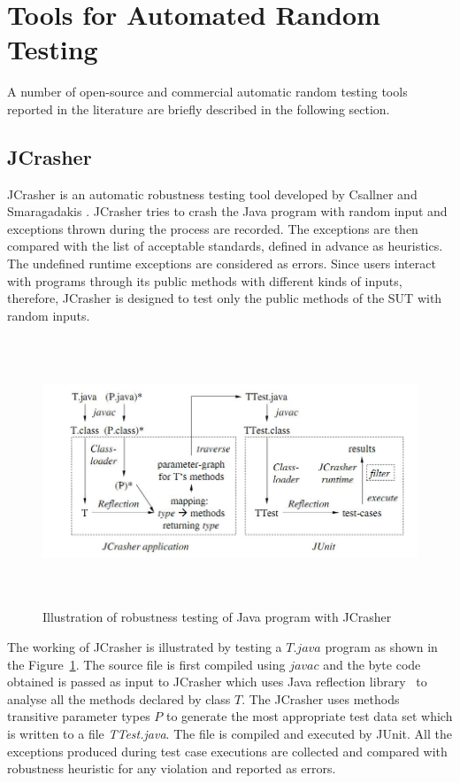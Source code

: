\section{Tools for Automated Random Testing}
A number of open-source and commercial automatic random testing tools reported in the literature are briefly described in the following section.


\subsection{JCrasher}
JCrasher is an automatic robustness testing tool developed by Csallner and Smaragadakis \cite{Pacheco2007b}. JCrasher tries to crash the Java program with random input and exceptions thrown during the process are recorded. The exceptions are then compared with the list of acceptable standards, defined in advance as heuristics. The undefined runtime exceptions are considered as errors. Since users interact with programs through its public methods with different kinds of inputs, therefore, JCrasher is designed to test only the public methods of the SUT with random inputs.

\begin{figure}[h]
	\centering
	\includegraphics[width=15cm, height=8cm]{chapter3/JCrasher.png}
	\caption{Illustration of robustness testing of Java program with JCrasher~\cite{Pacheco2007b}}
	\label{fig:JCrasher}
\end{figure}

The working of JCrasher is illustrated by testing a $T.java$ program as shown in the Figure~\ref{fig:JCrasher}. The source file is first compiled using $javac$ and the byte code obtained is passed as input to JCrasher which uses Java reflection library~\cite{chan1999java} to analyse all the methods declared by class $T$. The JCrasher uses methods transitive parameter types $P$ to generate the most appropriate test data set which is written to a file {\it TTest.java}. The file is compiled and executed by JUnit. All the exceptions produced during test case executions are collected and compared with robustness heuristic for any violation and reported as errors.\\

